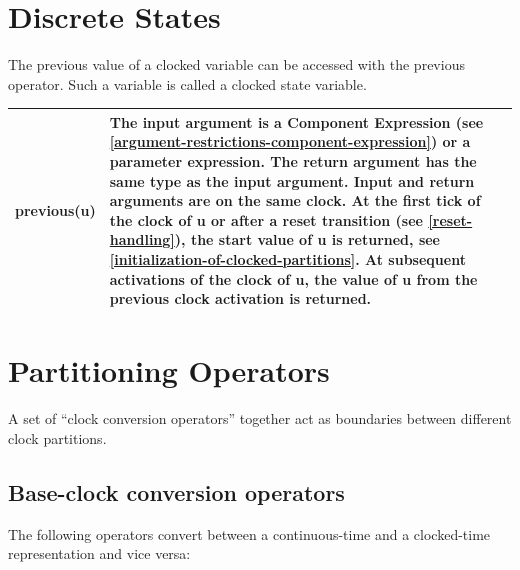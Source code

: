 \documentclass[10pt,a4paper]{report}
\def\doublelabel#1{\label{#1}\hypertarget{#1}{}}
\begin{document}
\section{Discrete States}\doublelabel{discrete-states}

The previous value of a clocked variable can be accessed with the
previous operator. Such a variable is called a clocked state variable.

\begin{longtable}[]{@{}ll@{}}
\hline
\endhead
\textbf{previous}(u) & The input argument is a Component Expression (see
\ref{argument-restrictions-component-expression}) or a parameter expression. The return argument has the
same type as the input argument. Input and return arguments are on the
same clock. At the first tick of the clock of u or after a reset
transition (see \ref{reset-handling}), the start value of u is returned, see
\ref{initialization-of-clocked-partitions}. At subsequent activations of the clock of u, the value of
u from the previous clock activation is returned.\\ \hline

\end{longtable}

\section{Partitioning Operators}\doublelabel{partitioning-operators}

A set of ``clock conversion operators'' together act as boundaries
between different clock partitions.

\subsection{Base-clock conversion operators}\doublelabel{base-clock-conversion-operators}

The following operators convert between a continuous-time and a
clocked-time representation and vice versa:
\end{document}
